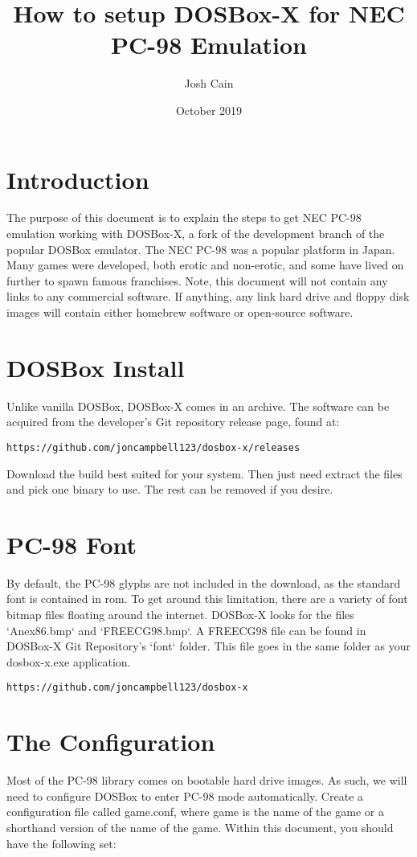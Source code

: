 \documentclass[letterpaper]{article}
\title{How to setup DOSBox-X for NEC PC-98 Emulation}
\author{Josh Cain}
\date{October 2019}
\begin{document}
   \maketitle
   \newpage
   \section{Introduction}
   The purpose of this document is to explain the steps to get NEC PC-98 emulation working with DOSBox-X, a fork of the development branch of the popular DOSBox emulator. The NEC PC-98 was a popular platform in Japan. Many games were developed, both erotic and non-erotic, and some have lived on further to spawn famous franchises. Note, this document will not contain any links to any commercial software. If anything, any link hard drive and floppy disk images will contain either homebrew software or open-source software.
   
   \section{DOSBox Install}
   Unlike vanilla DOSBox, DOSBox-X comes in an archive. The software can be acquired from the developer's Git repository release page, found at: 
   \begin{lstlisting}[frame=single]
   https://github.com/joncampbell123/dosbox-x/releases
   \end{lstlisting}   
   Download the build best suited for your system. Then just need extract the files and pick one binary to use. The rest can be removed if you desire.
   
   \section{PC-98 Font}
   By default, the PC-98 glyphs are not included in the download, as the standard font is contained in rom. To get around this limitation, there are a variety of font bitmap files floating around the internet. DOSBox-X looks for the files `Anex86.bmp` and `FREECG98.bmp`. A FREECG98 file can be found in DOSBox-X Git Repository's `font` folder. This file goes in the same folder as your dosbox-x.exe application.
   \begin{lstlisting}[frame=single]
   https://github.com/joncampbell123/dosbox-x
   \end{lstlisting}
   
   \section{The Configuration}
   Most of the PC-98 library comes on bootable hard drive images. As such, we will need to configure DOSBox to enter PC-98 mode automatically. Create a configuration file called game.conf, where game is the name of the game or a shorthand version of the name of the game. Within this document, you should have the following set:
   
\end{document}
